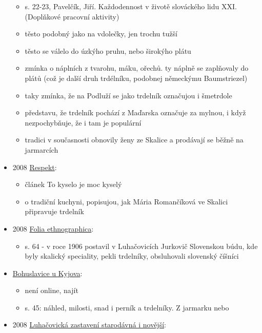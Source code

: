 \begin{itemize}
  \begin{itemize}
  \tightlist
  \item
    s. 22-23, Pavelčík, Jiří. Každodennost v životě slováckého lidu XXI.
    (Doplňkové pracovní aktivity)
  \item
    těsto podobný jako na vdolečky, jen trochu tužší
  \item
    těsto se válelo do úzkýho pruhu, nebo širokýho plátu
  \item
    zmínka o náplních z tvarohu, máku, ořechů. ty náplně se zaplňovaly
    do plátů (což je další druh trdélníku, podobnej německýmu
    Baumstriezel)
  \item
    taky zmínka, že na Podluží se jako trdelník označujou i šmetrdole
  \item
    představu, že trdelník pochází z Maďarska označuje za mylnou, i když
    nezpochybňuje, že i tam je populární
  \item
    tradici v současnosti obnovily ženy ze Skalice a prodávají se běžně
    na jarmarcích
  \end{itemize}
\item
  2008
  \href{https://ceskadigitalniknihovna.cz/uuid/uuid:e0d7de90-55fc-11e3-bc9f-5ef3fc9bb22f}{Respekt}:

  \begin{itemize}
  \tightlist
  \item
    článek To kyselo je moc kyselý
  \item
    o tradiční kuchyni, popisujou, jak Mária Romančíková ve Skalici
    připravuje trdelník
  \end{itemize}
\item
  2008
  \href{https://ndk.cz/uuid/uuid:d30cd530-5bfb-11e4-97e9-5ef3fc9bb22f}{Folia
  ethnographica}:

  \begin{itemize}
  \tightlist
  \item
    s. 64 - v roce 1906 postavil v Luhačovicích Jurkovič Slovenskou
    búdu, kde byly skalický speciality, pekli trdelníky, obsluhovali
    slovenský číšníci
  \end{itemize}
\item
  \href{https://ceskadigitalniknihovna.cz/uuid/uuid:0986bb00-6623-11e3-ae59-005056827e52}{Bohuslavice
  u Kyjova}:

  \begin{itemize}
  \tightlist
  \item
    není online, najít
  \item
    s. 45: náhled, milosti, snad i perník a trdelníky. Z jarmarku nebo
  \end{itemize}
\item
  2008
  \href{https://ceskadigitalniknihovna.cz/uuid/uuid:b2d480f0-9aeb-11e3-8e84-005056827e51}{Luhačovická
  zastavení starodávná i novější}:


\end{itemize}
